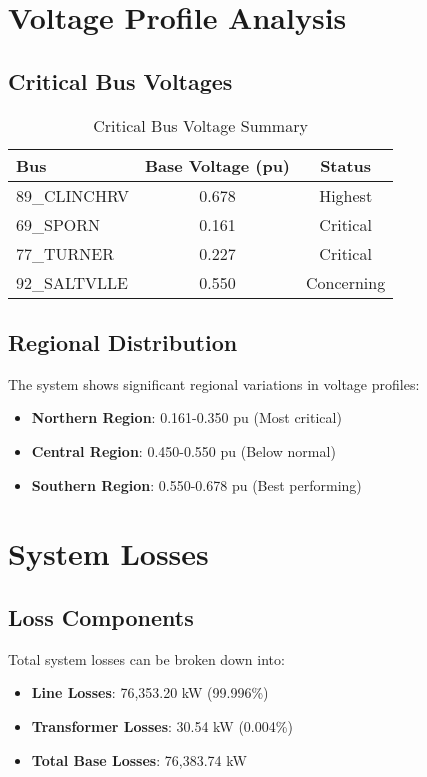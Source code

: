 \documentclass[11pt]{article}
\begin{document}
\section{Voltage Profile Analysis}

\subsection{Critical Bus Voltages}
\begin{table}[H]
\centering
\begin{tabular}{lcc}
\toprule
Bus & Base Voltage (pu) & Status \\
\midrule
89\_CLINCHRV & 0.678 & Highest \\
69\_SPORN & 0.161 & Critical \\
77\_TURNER & 0.227 & Critical \\
92\_SALTVLLE & 0.550 & Concerning \\
\bottomrule
\end{tabular}
\caption{Critical Bus Voltage Summary}
\end{table}

\subsection{Regional Distribution}
The system shows significant regional variations in voltage profiles:
\begin{itemize}
    \item \textbf{Northern Region}: 0.161-0.350 pu (Most critical)
    \item \textbf{Central Region}: 0.450-0.550 pu (Below normal)
    \item \textbf{Southern Region}: 0.550-0.678 pu (Best performing)
\end{itemize}

\section{System Losses}

\subsection{Loss Components}
Total system losses can be broken down into:
\begin{itemize}
    \item \textbf{Line Losses}: 76,353.20 kW (99.996\%)
    \item \textbf{Transformer Losses}: 30.54 kW (0.004\%)
    \item \textbf{Total Base Losses}: 76,383.74 kW
\end{itemize}
\end{document}
